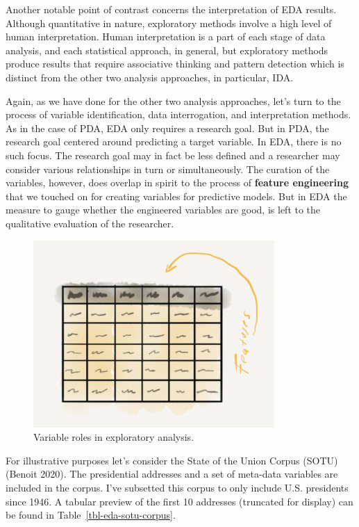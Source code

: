 \documentclass[
  letterpaper,
]{scrbook}
\begin{document}
Another notable point of contrast concerns the interpretation of EDA
results. Although quantitative in nature, exploratory methods involve a
high level of human interpretation. Human interpretation is a part of
each stage of data analysis, and each statistical approach, in general,
but exploratory methods produce results that require associative
thinking and pattern detection which is distinct from the other two
analysis approaches, in particular, IDA.

Again, as we have done for the other two analysis approaches, let's turn
to the process of variable identification, data interrogation, and
interpretation methods. As in the case of PDA, EDA only requires a
research goal. But in PDA, the research goal centered around predicting
a target variable. In EDA, there is no such focus. The research goal may
in fact be less defined and a researcher may consider various
relationships in turn or simultaneously. The curation of the variables,
however, does overlap in spirit to the process of \textbf{feature
engineering} that we touched on for creating variables for predictive
models. But in EDA the measure to gauge whether the engineered variables
are good, is left to the qualitative evaluation of the researcher.

\begin{figure}[h]

{\centering \includegraphics[width=3.61in,height=\textheight]{./figures/approaching-analysis/exploratory-variables.png}

}

\caption{\label{fig-aa-exploratory-variables}Variable roles in
exploratory analysis.}

\end{figure}

For illustrative purposes let's consider the State of the Union Corpus
(SOTU) (Benoit 2020). The presidential addresses and a set of meta-data
variables are included in the corpus. I've subsetted this corpus to only
include U.S. presidents since 1946. A tabular preview of the first 10
addresses (truncated for display) can be found in
Table~\ref{tbl-eda-sotu-corpus}.
\end{document}

